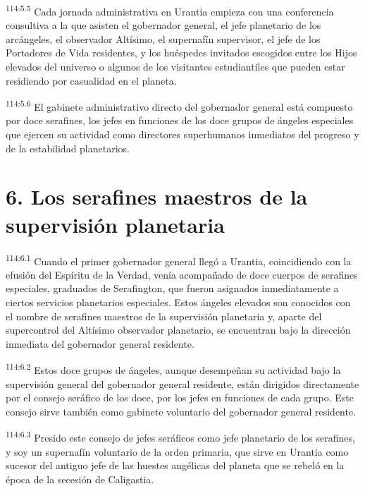 \documentclass[twoside, 11pt]{book}
\begin{document}
\par
\textsuperscript{114:5.5} Cada jornada administrativa en Urantia empieza con una conferencia consultiva a la que asisten el gobernador general, el jefe planetario de los arcángeles, el observador Altísimo, el supernafín supervisor, el jefe de los Portadores de Vida residentes, y los huéspedes invitados escogidos entre los Hijos elevados del universo o algunos de los visitantes estudiantiles que pueden estar residiendo por casualidad en el planeta.

\par
\textsuperscript{114:5.6} El gabinete administrativo directo del gobernador general está compuesto por doce serafines, los jefes en funciones de los doce grupos de ángeles especiales que ejercen su actividad como directores superhumanos inmediatos del progreso y de la estabilidad planetarios.

\section*{6. Los serafines maestros de la supervisión planetaria}
\par
\textsuperscript{114:6.1} Cuando el primer gobernador general llegó a Urantia, coincidiendo con la efusión del Espíritu de la Verdad, venía acompañado de doce cuerpos de serafines especiales, graduados de Serafington, que fueron asignados inmediatamente a ciertos servicios planetarios especiales. Estos ángeles elevados son conocidos con el nombre de serafines maestros de la supervisión planetaria y, aparte del supercontrol del Altísimo observador planetario, se encuentran bajo la dirección inmediata del gobernador general residente.

\par
\textsuperscript{114:6.2} Estos doce grupos de ángeles, aunque desempeñan su actividad bajo la supervisión general del gobernador general residente, están dirigidos directamente por el consejo seráfico de los doce, por los jefes en funciones de cada grupo. Este consejo sirve también como gabinete voluntario del gobernador general residente.

\par
\textsuperscript{114:6.3} Presido este consejo de jefes seráficos como jefe planetario de los serafines, y soy un supernafín voluntario de la orden primaria, que sirve en Urantia como sucesor del antiguo jefe de las huestes angélicas del planeta que se rebeló en la época de la secesión de Caligastia.
\end{document}
